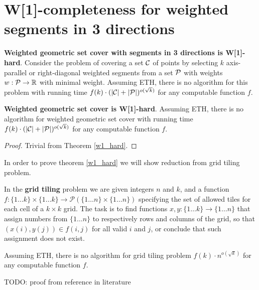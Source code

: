 \section{W[1]-completeness for weighted segments in 3 directions}

\begin{tw}
\label{w1_hard}
	\textbf{Weighted geometric set cover with segments in 3 directions is W[1]-hard}.
	Consider the problem of covering a set $\mathcal{C}$ of points
	by selecting $k$ axis-parallel or right-diagonal weighted segments
	from a set $\mathcal{P}$ 
	with weights $w : \mathcal{P} \rightarrow \mathbb{R}$
	with minimal weight.
	Assuming ETH, there is no algorithm for this
	problem with running time
	$f(k)\cdot(|\mathcal{C}| + |\mathcal{P}|)^{o(\sqrt{k})}$
	for any computable function $f$.
\end{tw}

\begin{corollary}
	\textbf{Weighted geometric set cover is W[1]-hard}.
	Assuming ETH, there is no algorithm for weighted geometric set cover
	with running time
	$f(k)\cdot(|\mathcal{C}| + |\mathcal{P}|)^{o(\sqrt{k})}$
	for any computable function $f$.
\end{corollary}

\begin{proof}
Trivial from Theorem \ref{w1_hard}. 
\end{proof}

In order to prove theorem \ref{w1_hard} we will show reduction from grid tiling problem.

\begin{defi}
In the \textbf{grid tiling} problem we are given integers $n$ and $k$,
and a function
$f : \{1 \ldots k\} \times \{1 \ldots k\} \rightarrow \mathcal{P}(\{1 \ldots n\} \times \{1 \ldots n\})$
specifying the set of allowed tiles for each cell of a $k \times k$ grid.
The task is to find functions
$x,y : \{1 \ldots k\} \rightarrow \{1 \ldots n\}$
that assign numbers from $\{1 \ldots n\}$
to respectively rows and columns of the grid,
so that $(x(i), y(j)) \in f(i, j)$ for all valid $i$ and $j$,
or conclude that such assignment does not exist.
\end{defi}


\begin{tw}
\label{grid_tiling_w1_hard}
Assuming ETH, there is no algorithm for grid tiling problem
$f(k)\cdot n^{o(\sqrt{k})}$
for any computable function $f$.
\end{tw}

TODO: proof from reference in literature

